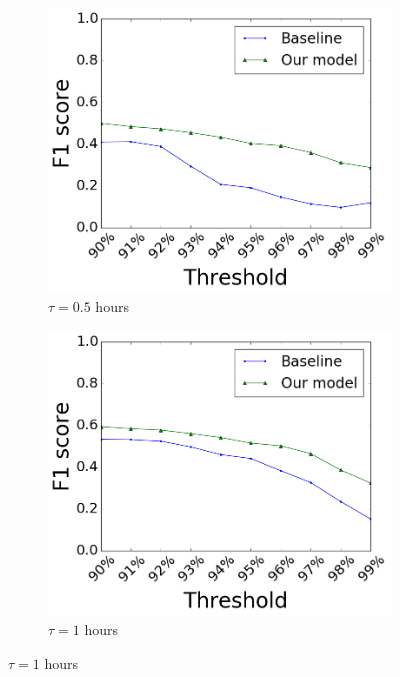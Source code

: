 \begin{figure}[t]
\centering

\begin{subfigure}{.32\textwidth}
\centering
\includegraphics[width=.99\linewidth]{img/chap3/gdelt_30_mins.png}
\caption{$\tau=0.5$ hours}\label{fig:gdelt1}
\end{subfigure}
\begin{subfigure}{.32\textwidth}
\centering
\includegraphics[width=.99\linewidth]{img/chap3/gdelt_60_mins.png}
\caption{$\tau=1$ hours}\label{fig:gdelt2}
\end{subfigure}

\end{figure}

